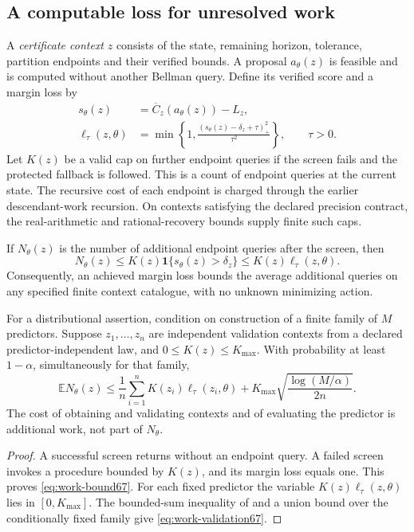 \subsection{A computable loss for unresolved work}
A \emph{certificate context} $z$ consists of the state, remaining horizon, tolerance, partition endpoints and their verified bounds. A proposal $a_\theta(z)$ is feasible and is computed without another Bellman query. Define its verified score and a margin loss by
\begin{align}
 s_\theta(z)&=\overline C_z(a_\theta(z))-L_z,\label{eq:score67}\\
 \ell_\tau(z,\theta)&=\min\left\{1,
       \frac{(s_\theta(z)-\delta_z+\tau)_+^2}{\tau^2}\right\},
       \qquad \tau>0.\label{eq:work-loss67}
\end{align}
Let $K(z)$ be a valid cap on further endpoint queries if the screen fails and the protected fallback is followed. This is a count of endpoint queries at the current state. The recursive cost of each endpoint is charged through the earlier descendant-work recursion. On contexts satisfying the declared precision contract, the real-arithmetic and rational-recovery bounds supply finite such caps.

\begin{theorem}\label{thm:work-loss67}
If $N_\theta(z)$ is the number of additional endpoint queries after the screen, then
\begin{equation}\label{eq:work-bound67}
 N_\theta(z)\le K(z)\mathbf1\{s_\theta(z)>\delta_z\}
                    \le K(z)\ell_\tau(z,\theta).
\end{equation}
Consequently, an achieved margin loss bounds the average additional queries on any specified finite context catalogue, with no unknown minimizing action.

For a distributional assertion, condition on construction of a finite family of $M$ predictors. Suppose $z_1,\ldots,z_n$ are independent validation contexts from a declared predictor-independent law, and $0\le K(z)\le K_{\max}$. With probability at least $1-\alpha$, simultaneously for that family,
\begin{equation}\label{eq:work-validation67}
 \mathbb E N_\theta(z)\le
 \frac1n\sum_{i=1}^n K(z_i)\ell_\tau(z_i,\theta)
 +K_{\max}\sqrt{\frac{\log(M/\alpha)}{2n}}.
\end{equation}
The cost of obtaining and validating contexts and of evaluating the predictor is additional work, not part of $N_\theta$.
\end{theorem}
\begin{proof}
A successful screen returns without an endpoint query. A failed screen invokes a procedure bounded by $K(z)$, and its margin loss equals one. This proves \eqref{eq:work-bound67}. For each fixed predictor the variable $K(z)\ell_\tau(z,\theta)$ lies in $[0,K_{\max}]$. The bounded-sum inequality of \citet{hoeffding1963} and a union bound over the conditionally fixed family give \eqref{eq:work-validation67}.
\end{proof}

